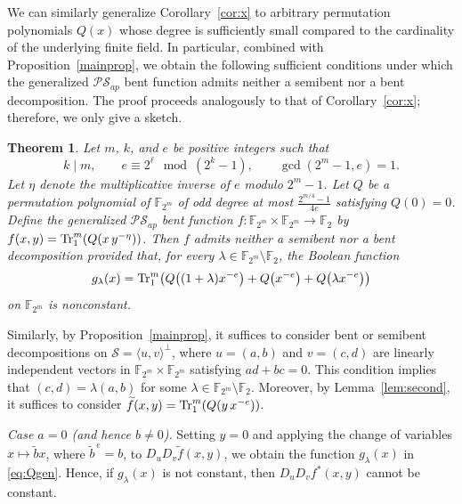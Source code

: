 \documentclass[12pt]{article}
\theoremstyle{plain}
\newtheorem{theorem}{Theorem}
\theoremstyle{definition}
\renewcommand{\to}{\rightarrow}
\newcommand{\Tr}{{\rm Tr}}
\begin{document}
	We can similarly generalize Corollary~\ref{cor:x} to arbitrary permutation
	polynomials $Q(x)$ whose degree is sufficiently small compared to the
	cardinality of the underlying finite field. In particular, combined with
	Proposition~\ref{mainprop}, we obtain the following sufficient conditions under
	which the generalized $\mathcal{PS}_{ap}$ bent function admits neither a
	semibent nor a bent decomposition. The proof proceeds analogously to that of Corollary~\ref{cor:x}; therefore, we only give a sketch.
	
	\begin{theorem}\label{thm:gps}
		Let $m$, $k$, and $e$ be positive integers such that
		\[
		k \mid m, 
		\qquad  
		e \equiv 2^{\ell} \mod{(2^{k}-1)},
		\qquad 
		\gcd(2^{m}-1,e)=1.
		\]
		Let $\eta$ denote the multiplicative inverse of $e$ modulo $2^{m}-1$.
		Let $Q$ be a permutation polynomial of $\mathbb{F}_{2^{m}}$ 
		of odd degree at most $\tfrac{2^{m/4}-1}{4e}$ satisfying $Q(0)=0$.
		Define the generalized $\mathcal{PS}_{ap}$ bent function 
		$f \colon \mathbb{F}_{2^{m}} \times \mathbb{F}_{2^{m}} \to \mathbb{F}_2$ by $f(x,y)= \Tr_1^{m}\!\left(Q\!\left(x\,y^{-\eta}\right)\right)$.
		Then $f$ admits neither a semibent nor a bent decomposition provided that, 
		for every $\lambda \in \mathbb{F}_{2^{m}} \setminus \mathbb{F}_2$, 
		the Boolean function
		\begin{equation}\label{eq:Qgen}
			g_\lambda(x)
			= \Tr_1^{m}\!\left(
			Q\!\left((1+\lambda)x^{-e}\right)
			+ Q\!\left(x^{-e}\right)
			+ Q\!\left(\lambda x^{-e}\right)
			\right)
		\end{equation}
		on $\mathbb{F}_{2^{m}}$ is nonconstant.
	\end{theorem}

	Similarly, by Proposition~\ref{mainprop}, it suffices to consider bent or semibent 
	decompositions on $\mathcal{S}=\langle u,v\rangle^{\perp}$,
	where $u=(a,b)$ and $v=(c,d)$ are linearly independent vectors in 
	$\mathbb{F}_{2^{m}} \times \mathbb{F}_{2^{m}}$ satisfying $ad+bc=0$.
	This condition implies that
	$(c,d) =\lambda (a,b)$ for some 
	$\lambda \in \mathbb{F}_{2^{m}}\setminus \mathbb{F}_{2}$.
	Moreover, by Lemma~\ref{lem:second}, it suffices to consider $\widetilde{f}(x,y)=\Tr_1^{m}(Q(y\,x^{-e}))$.
	
	\medskip
	
	\noindent
	\emph{Case $a=0$ (and hence $b\neq 0$).}
	Setting $y=0$ and applying the change of variables $x \mapsto \tilde{b}x$,
	where $\tilde{b}^{\,e}=b$, to $D_u D_v \widetilde{f}(x,y)$,
	we obtain the function
	$g_\lambda(x)$ in \eqref{eq:Qgen}. Hence, if $g_\lambda(x)$ is not constant, then
	$D_u D_v f^{\ast}(x,y)$ cannot be constant.
	
\end{document}
